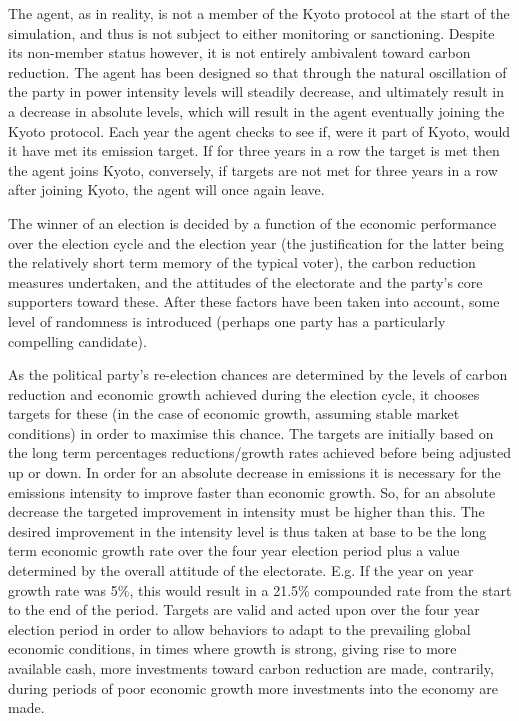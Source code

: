 \documentclass[]{article} %
\begin{document}
The agent, as in reality, is not a member of the Kyoto protocol at the start of the simulation, and thus is not subject to either monitoring or sanctioning. Despite its non-member status however, it is not entirely ambivalent toward carbon reduction. The agent has been designed so that through the natural oscillation of the party in power intensity levels will steadily decrease, and ultimately result in a decrease in absolute levels, which will result in the agent eventually joining the Kyoto protocol. Each year the agent checks to see if, were it part of Kyoto, would it have met its emission target. If for three years in a row the target is met then the agent joins Kyoto, conversely, if targets are not met for three years in a row after joining Kyoto, the agent will once again leave.

The winner of an election is decided by a function of the economic performance over the election cycle and the election year (the justification for the latter  being the relatively short term memory of the typical voter), the carbon reduction measures undertaken, and the attitudes of the electorate and the party’s core supporters toward these. After these factors have been taken into account, some level of randomness is introduced (perhaps one party has a particularly compelling candidate).

As the political party’s re-election chances are determined by the levels of carbon reduction and economic growth achieved during the election cycle, it chooses targets for these (in the case of economic growth, assuming stable market conditions) in order to maximise this chance. The targets are initially based on the long term percentages reductions/growth rates achieved before being adjusted up or down. In order for an absolute decrease in emissions it is necessary for the emissions intensity to improve faster than economic growth. So, for an absolute decrease the targeted improvement in intensity must be higher than this. The desired improvement in the intensity level is thus taken at base to be the long term economic growth rate over the four year election period plus a value determined by the overall attitude of the electorate. E.g. If the year on year growth rate was 5\%, this would result in a 21.5\% compounded rate from the start to the end of the period. Targets are valid and acted upon over the four year election period in order to allow behaviors to adapt to the prevailing global economic conditions, in times where growth is strong, giving rise to more available cash, more investments toward carbon reduction are made, contrarily, during periods of poor economic growth more investments into the economy are made. 
\end{document}
